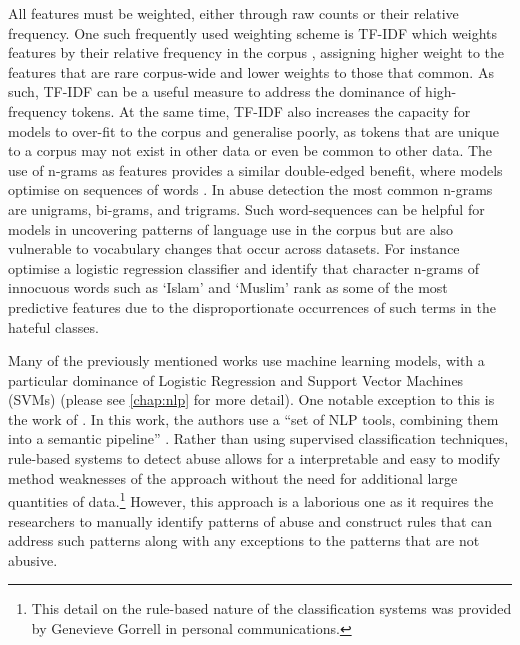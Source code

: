All features must be weighted, either through raw counts or their relative frequency.
One such frequently used weighting scheme is TF-IDF which weights features by their relative frequency in the corpus \citep{Fortuna:2018}, assigning higher weight to the features that are rare corpus-wide and lower weights to those that common.
As such, TF-IDF can be a useful measure to address the dominance of high-frequency tokens.
At the same time, TF-IDF also increases the capacity for models to over-fit to the corpus and generalise poorly, as tokens that are unique to a corpus may not exist in other data or even be common to other data.
The use of n-grams as features provides a similar double-edged benefit, where models optimise on sequences of words .
In abuse detection the most common n-grams are unigrams, bi-grams, and trigrams.
Such word-sequences can be helpful for models in uncovering patterns of language use in the corpus but are also vulnerable to vocabulary changes that occur across datasets.
For instance \citet{Waseem-Hovy:2016} optimise a logistic regression classifier and identify that character n-grams of innocuous words such as `Islam' and `Muslim' rank as some of the most predictive features due to the disproportionate occurrences of such terms in the hateful classes.

Many of the previously mentioned works use  machine learning models, with a particular dominance of Logistic Regression and Support Vector Machines (SVMs) (please see \cref{chap:nlp} for more detail).
One notable exception to this is the work of \citet{Gorrell:2018}.
In this work, the authors use a ``set of NLP tools, combining them into a semantic pipeline'' \citep[pp. 601]{Gorrell:2018}.
Rather than using supervised classification techniques,  rule-based systems to detect abuse allows for a interpretable and easy to modify method weaknesses of the approach without the need for additional large quantities of data.\footnote{This detail on the rule-based nature of the classification systems was provided by Genevieve Gorrell in personal communications.}
However, this approach is a laborious one as it requires the researchers to manually identify patterns of abuse and construct rules that can address such patterns along with any exceptions to the patterns that are not abusive.

